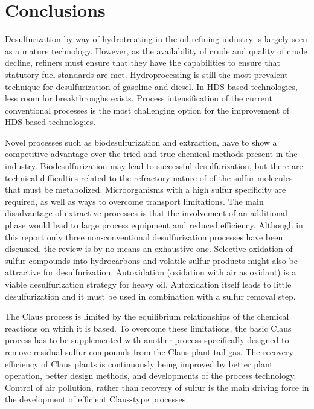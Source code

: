 \chapter{Conclusions}
\thispagestyle{plain}

Desulfurization by way of hydrotreating in the oil refining industry is largely seen as a mature technology. However, as the availability of crude and quality of crude decline, refiners must ensure that they have the capabilities to ensure that statutory fuel standards are met. Hydroprocessing is still the most prevalent technique for desulfurization of gasoline and diesel. In HDS based technologies, less room for breakthroughs exists. Process intensification of the current conventional processes is the most challenging option for the improvement of HDS based technologies. 

Novel processes such as biodesulfurization and extraction, have to show a competitive advantage over the tried-and-true chemical methods present in the industry. Biodesulfurization may lead to successful desulfurization, but there are technical difficulties related to the refractory nature of of the sulfur molecules that must be metabolized. Microorganisms with a high sulfur specificity are required, as well as ways to overcome transport limitations. The main disadvantage of extractive processes is that the involvement of an additional phase would lead to large process equipment and reduced efficiency. Although in this report only three non-conventional desulfurization processes have been discussed, the review is by no means an exhaustive one. Selective oxidation of sulfur compounds into hydrocarbons and volatile sulfur products might also be attractive for desulfurization. Autoxidation (oxidation with air as oxidant) is a viable desulfurization strategy for heavy oil. Autoxidation itself leads to little desulfurization and it must be used in combination with a sulfur removal step. 

The Claus process is limited by the equilibrium relationships of the chemical reactions on which it is based. To overcome these limitations, the basic Claus process has to be supplemented with another process specifically designed to remove residual sulfur compounds from the Claus plant tail gas. The recovery efficiency of Claus plants is continuously being improved by better plant operation, better design methods, and developments of the process technology. Control of air pollution, rather than recovery of sulfur is the main driving force in the development of efficient Claus-type processes.
